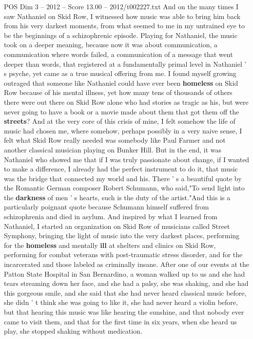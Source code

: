 \begin{textsample}{POS Dim 3 – 2012 – Score 13.00 – 2012/t002227.txt}
And on the many times I saw Nathaniel on Skid Row, I witnessed how music was able to bring him back from his very darkest moments, from what seemed to me in my untrained eye to be the beginnings of a schizophrenic episode.
Playing for Nathaniel, the music took on a deeper meaning, because now it was about communication, a communication where words failed, a communication of a message that went deeper than words, that registered at a fundamentally primal level in Nathaniel ' s psyche, yet came as a true musical offering from me.
I found myself growing outraged that someone like Nathaniel could have ever been \textbf{homeless} on Skid Row because of his mental illness, yet how many tens of thousands of others there were out there on Skid Row alone who had stories as tragic as his, but were never going to have a book or a movie made about them that got them off the \textbf{streets}?
And at the very core of this crisis of mine, I felt somehow the life of music had chosen me, where somehow, perhaps possibly in a very naive sense, I felt what Skid Row really needed was somebody like Paul Farmer and not another classical musician playing on Bunker Hill.
But in the end, it was Nathaniel who showed me that if I was truly passionate about change, if I wanted to make a difference, I already had the perfect instrument to do it, that music was the bridge that connected my world and his.
There ' s a beautiful quote by the Romantic German composer Robert Schumann, who said,"To send light into the \textbf{darkness} of men ' s hearts, such is the duty of the artist."And this is a particularly poignant quote because Schumann himself suffered from schizophrenia and died in asylum.
And inspired by what I learned from Nathaniel, I started an organization on Skid Row of musicians called Street Symphony, bringing the light of music into the very darkest places, performing for the \textbf{homeless} and mentally \textbf{ill} at shelters and clinics on Skid Row, performing for combat veterans with post-traumatic stress disorder, and for the incarcerated and those labeled as criminally insane.
After one of our events at the Patton State Hospital in San Bernardino, a woman walked up to us and she had tears streaming down her face, and she had a palsy, she was shaking, and she had this gorgeous smile, and she said that she had never heard classical music before, she didn ' t think she was going to like it, she had never heard a violin before, but that hearing this music was like hearing the sunshine, and that nobody ever came to visit them, and that for the first time in six years, when she heard us play, she stopped shaking without medication.

\end{textsample}
